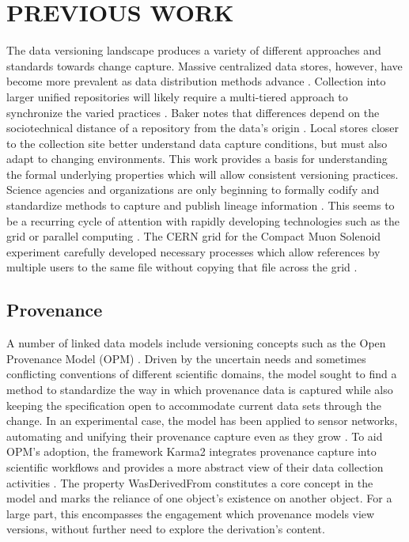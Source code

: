 
\chapter{PREVIOUS WORK}

The data versioning landscape produces a variety of different approaches and standards towards change capture.
Massive centralized data stores, however, have become more prevalent as data distribution methods advance  \cite{Vassiliadis1999}.
Collection into larger unified repositories will likely require a multi-tiered approach to synchronize the varied practices  \cite{Baker2009}.
Baker notes that differences depend on the sociotechnical distance of a repository from the data's origin \cite{Baker2009}.
Local stores closer to the collection site better understand data capture conditions, but must also adapt to changing environments.
This work provides a basis for understanding the formal underlying properties which will allow consistent versioning practices.
Science agencies and organizations are only beginning to formally codify and standardize methods to capture and publish lineage information \cite{MatthewS.Mayernik201312-039}.
This seems to be a recurring cycle of attention with rapidly developing technologies such as the grid or parallel computing \cite{Kovse2003VGridAVS}.
The CERN grid for the Compact Muon Solenoid experiment carefully developed necessary processes which allow references by multiple users to the same file without copying that file across the grid \cite{Holtman:687353}.

\section{Provenance}

A number of linked data models include versioning concepts such as the Open Provenance Model (OPM) \cite{moreau2008open}.
Driven by the uncertain needs and sometimes conflicting conventions of different scientific domains, the model sought to find a method to standardize the way in which provenance data is captured while also keeping the specification open to accommodate current data sets through the change.
In an experimental case, the model has been applied to sensor networks, automating and unifying their provenance capture even as they grow \cite{5478496}.
To aid OPM's adoption, the framework Karma2 integrates provenance capture into scientific workflows and provides a more abstract view of their data collection activities \cite{simmhan2010karma2}.
The property WasDerivedFrom constitutes a core concept in the model and marks the reliance of one object's existence on another object.
For a large part, this encompasses the engagement which provenance models view versions, without further need to explore the derivation's content.

